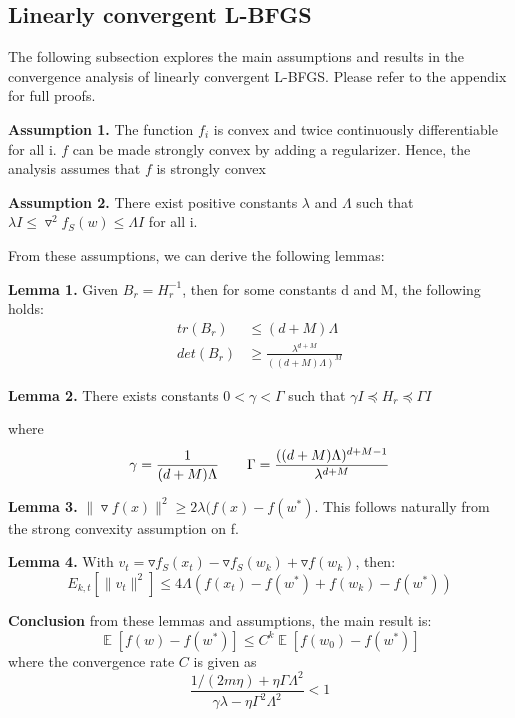 \documentclass[journal,onecolumn]{IEEEtran}
\DeclareMathOperator{\E}{\mathbb{E}}
\begin{document}
\subsection{Linearly convergent L-BFGS}
The following subsection explores the main assumptions and results in the convergence analysis of linearly convergent L-BFGS. Please refer to the appendix for full proofs.

\textbf{Assumption 1.} The function $ f_i $ is convex and twice continuously differentiable for all i. $ f $ can be made strongly convex by adding a regularizer. Hence, the analysis assumes that $ f $ is strongly convex

\textbf{Assumption 2.} There exist positive constants $ \lambda $ and $ \Lambda $ such that $ \lambda I \leq \triangledown^2f_{S}(w) \leq \Lambda I$ for all i.

From these assumptions, we can derive the following lemmas:

\textbf{Lemma 1.} Given $ B_r = H_r^{-1} $, then for some constants d and M, the following holds:
\begin{equation*}\begin{split}
	tr(B_r) &\leq (d+M)\Lambda\\
	det(B_r) &\geq \frac{\lambda^{d+M}}{((d+M)\Lambda)^M}
\end{split}
\end{equation*}

\textbf{Lemma 2.} There exists constants $ 0 < \gamma < \Gamma $ such that $ \gamma I \preceq H_r \preceq \Gamma I $

where 
\begin{equation*}
	\gamma =  \frac{1}{(d+M)\Lambda}
	 \hspace{2em}\Gamma = \frac{((d+M)\Lambda)^{d+M-1}}{\lambda^{d+M}}\\
\end{equation*}

\textbf{Lemma 3.} $ \rVert \triangledown f(x) \rVert^2 \geq 2\lambda (f(x)-f(w^*) $. This follows naturally from the strong convexity assumption on f.

\textbf{Lemma 4. } With $ v_t = \triangledown f_S(x_t)-\triangledown f_S(w_k)+\triangledown f(w_k) $, then:
\begin{equation*}
	E_{k,t}[\rVert v_t \rVert^2] \leq 4\Lambda(f(x_t)-f(w^*)+f(w_k)-f(w^*))
\end{equation*}

\textbf{Conclusion } from these lemmas and assumptions, the main result is:
\begin{equation*}
	\E [f(w)-f(w^*)] \leq C^k \E [f(w_0)-f(w^*)]
\end{equation*} 
where the convergence rate $ C $ is given as
\begin{equation*}
	\frac{1/(2m\eta)+\eta \Gamma \Lambda^2}{\gamma \lambda - \eta \Gamma^2\Lambda^2} < 1
\end{equation*}
\end{document}

